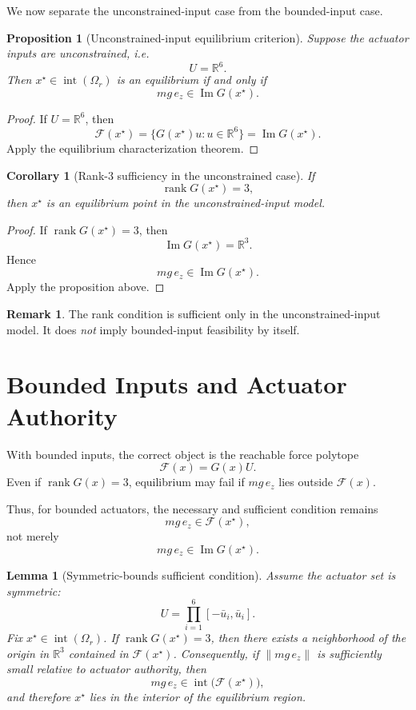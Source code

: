\documentclass[11pt]{article}
\newtheorem{proposition}{Proposition}
\newtheorem{corollary}{Corollary}
\newtheorem{lemma}{Lemma}
\theoremstyle{definition}
\newtheorem{remark}{Remark}
\begin{document}
We now separate the unconstrained-input case from the bounded-input case.

\begin{proposition}[Unconstrained-input equilibrium criterion]
Suppose the actuator inputs are unconstrained, i.e.
\[
U = \mathbb{R}^6.
\]
Then \(x^\star \in \operatorname{int}(\Omega_r)\) is an equilibrium if and only if
\[
mg\,e_z \in \operatorname{Im} G(x^\star).
\]
\end{proposition}

\begin{proof}
If \(U=\mathbb{R}^6\), then
\[
\mathcal{F}(x^\star)=\{G(x^\star)u : u \in \mathbb{R}^6\}=\operatorname{Im} G(x^\star).
\]
Apply the equilibrium characterization theorem.
\end{proof}

\begin{corollary}[Rank-3 sufficiency in the unconstrained case]
If
\[
\operatorname{rank} G(x^\star)=3,
\]
then \(x^\star\) is an equilibrium point in the unconstrained-input model.
\end{corollary}

\begin{proof}
If \(\operatorname{rank} G(x^\star)=3\), then
\[
\operatorname{Im} G(x^\star)=\mathbb{R}^3.
\]
Hence
\[
mg\,e_z \in \operatorname{Im} G(x^\star).
\]
Apply the proposition above.
\end{proof}

\begin{remark}
The rank condition is sufficient only in the unconstrained-input model. It does \emph{not} imply bounded-input feasibility by itself.
\end{remark}

\section{Bounded Inputs and Actuator Authority}

With bounded inputs, the correct object is the reachable force polytope
\[
\mathcal{F}(x)=G(x)U.
\]
Even if \(\operatorname{rank}G(x)=3\), equilibrium may fail if \(mg\,e_z\) lies outside \(\mathcal{F}(x)\).

Thus, for bounded actuators, the necessary and sufficient condition remains
\[
mg\,e_z \in \mathcal{F}(x^\star),
\]
not merely
\[
mg\,e_z \in \operatorname{Im}G(x^\star).
\]

\begin{lemma}[Symmetric-bounds sufficient condition]
Assume the actuator set is symmetric:
\[
U = \prod_{i=1}^6 [-\bar u_i,\bar u_i].
\]
Fix \(x^\star \in \operatorname{int}(\Omega_r)\). If \(\operatorname{rank}G(x^\star)=3\), then there exists a neighborhood of the origin in \(\mathbb{R}^3\) contained in \(\mathcal{F}(x^\star)\). Consequently, if \(\|mg\,e_z\|\) is sufficiently small relative to actuator authority, then
\[
mg\,e_z \in \operatorname{int}\big(\mathcal{F}(x^\star)\big),
\]
and therefore \(x^\star\) lies in the interior of the equilibrium region.
\end{lemma}
\end{document}
